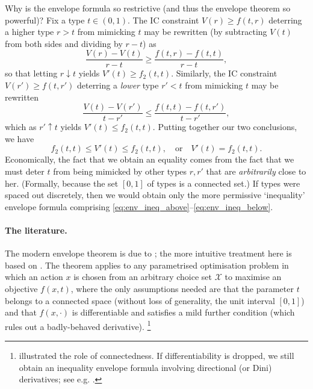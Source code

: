 \begin{remark}
	\label{remark:env_powerful}
	Why is the envelope formula so restrictive (and thus the envelope theorem so powerful)?
	Fix a type $t \in (0,1)$.
	The IC constraint $V(r) \geq f(t,r)$
	deterring a higher type $r>t$ from mimicking $t$
	may be rewritten (by subtracting $V(t)$ from both sides and dividing by $r-t$) as
	\begin{equation}
		\frac{V(r) - V(t)}{r-t} \geq \frac{f(t,r) - f(t,t)}{r-t} ,
		\label{eq:env_ineq_above}
	\end{equation}
	so that letting $r \downarrow t$ yields $V'(t) \geq f_2(t,t)$.
	Similarly, the IC constraint $V(r') \geq f(t,r')$
	deterring a \emph{lower} type $r'<t$ from mimicking $t$
	may be rewritten
	\begin{equation}
		\frac{V(t) - V(r')}{t-r'} \leq \frac{f(t,t) - f(t,r')}{t-r'} ,
		\label{eq:env_ineq_below}
	\end{equation}
	which as $r' \uparrow t$ yields $V'(t) \leq f_2(t,t)$.
	Putting together our two conclusions, we have
	\begin{equation*}
		f_2(t,t) \leq V'(t) \leq f_2(t,t) ,
		\quad \text{or} \quad
		V'(t) = f_2(t,t) .
	\end{equation*}
	Economically, the fact that we obtain an equality comes from the fact that we must deter $t$ from being mimicked by other types $r,r'$ that are \emph{arbitrarily} close to her. (Formally, because the set $[0,1]$ of types is a connected set.)
	If types were spaced out discretely, then we would obtain only the more permissive `inequality' envelope formula comprising \eqref{eq:env_ineq_above}--\eqref{eq:env_ineq_below}.
\end{remark}


\paragraph{The literature.}
The modern envelope theorem is due to \textcite{MilgromSegal2002};
the more intuitive treatment here is based on \textcite{Sinander2021}.
The theorem applies to any parametrised optimisation problem in which an action $x$ is chosen from an arbitrary choice set $\mathcal{X}$ to maximise an objective $f(x,t)$,
where the only assumptions needed are that the parameter $t$ belongs to a connected space (without loss of generality, the unit interval $[0,1]$) and that $f(x,\cdot)$ is differentiable and satisfies a mild further condition (which rules out a badly-behaved derivative).%
	\footnote{ illustrated the role of connectedness.
	If differentiability is dropped, we still obtain an inequality envelope formula involving directional (or Dini) derivatives; see e.g. \textcite{CarbajalEly2013}.}



